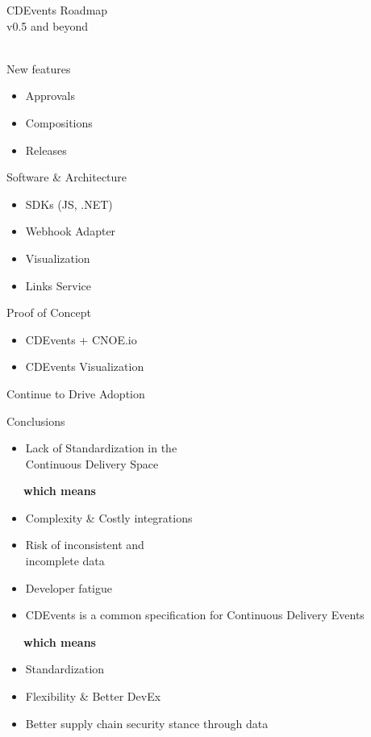 \documentclass[aspectratio=169,11pt,hyperref={colorlinks=true}]{beamer}
\begin{document}
\begin{stripedframe}%
  {%
  CDEvents Roadmap \\
  v0.5 and beyond \\
  ~
  }%
  {%
  New features
  \vspace{0.02\textheight}
  \begin{itemize}
    \item Approvals
    \item Compositions
    \item Releases
  \end{itemize}
  }%
  {%
  Software \& Architecture
  \vspace{0.02\textheight}
  \begin{itemize}
    \item SDKs (JS, .NET)
    \item Webhook Adapter
    \item Visualization
    \item Links Service
  \end{itemize}
  }%
  {%
  Proof of Concept
  \vspace{0.02\textheight}
  \begin{itemize}
    \item CDEvents + CNOE.io
    \item CDEvents Visualization
  \end{itemize}
  }%
  {%
  Continue to Drive Adoption
  }%
\end{stripedframe}

\begin{2columnsframe}{Conclusions}%
  {%
  \begin{itemize}
    \item Lack of Standardization in the\\
    Continuous Delivery Space
  \end{itemize}
  \vspace{0.22\textheight}
  ~~~\textbf{which means}
  \vspace{0.05\textheight}
  \begin{itemize}
    \item Complexity \& Costly integrations
    \item Risk of inconsistent and\\
          incomplete data
    \item Developer fatigue
  \end{itemize}
  }{%
  \begin{itemize}
    \item CDEvents is a common specification for Continuous Delivery Events
  \end{itemize}
  \vspace{0.22\textheight}
  ~~~\textbf{which means}
  \vspace{0.05\textheight}
  \begin{itemize}
    \item Standardization
    \item Flexibility \& Better DevEx
    \item Better supply chain security stance through data
  \end{itemize}
  }
\end{2columnsframe}
\end{document}
